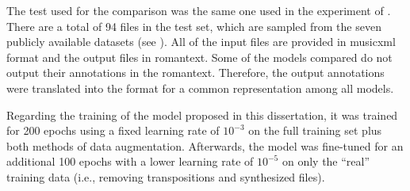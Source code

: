 
The test used for the comparison was the same one used in
the experiment of .
There are a total of 94 files in the test set, which are
sampled from the seven publicly available datasets (see
). All of the input files
are provided in \gls{musicxml} format and the output files
in \gls{romantext}. Some of the models compared do not
output their annotations in the \gls{romantext}. Therefore,
the output annotations were translated into the format for a
common representation among all models.

Regarding the training of the model proposed in this
dissertation, it was trained for 200 epochs using a fixed
learning rate of $10^{-3}$ on the full training set plus
both methods of data augmentation. Afterwards, the model was
fine-tuned for an additional 100 epochs with a lower
learning rate of $10^{-5}$ on only the ``real'' training
data (i.e., removing transpositions and synthesized files).


